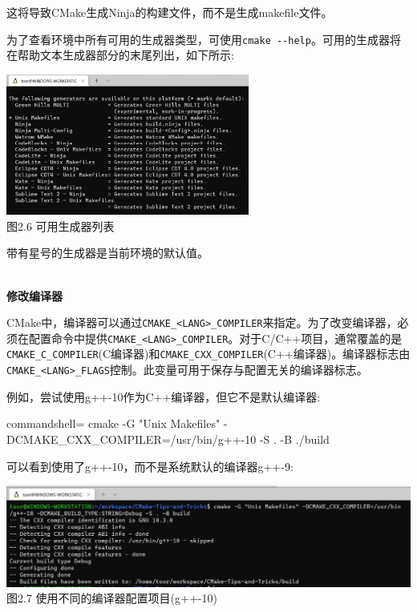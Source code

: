 这将导致CMake生成Ninja的构建文件，而不是生成makefile文件。

为了查看环境中所有可用的生成器类型，可使用\texttt{cmake -{}-help}。可用的生成器将在帮助文本生成器部分的末尾列出，如下所示:

\begin{center}
\includegraphics[width=0.6\textwidth]{content/1/chapter2/images/6.jpg}\\
图2.6 可用生成器列表
\end{center}

带有星号的生成器是当前环境的默认值。

\hspace*{\fill} \\ %
\noindent
\textbf{修改编译器}

CMake中，编译器可以通过\texttt{CMAKE\_<LANG>\_COMPILER}来指定。为了改变编译器，必须在配置命令中提供\texttt{CMAKE\_<LANG>\_COMPILER}。对于C/C++项目，通常覆盖的是\texttt{CMAKE\_C\_COMPILER}(C编译器)和\texttt{CMAKE\_CXX\_COMPILER}(C++编译器)。编译器标志由\texttt{CMAKE\_<LANG>\_FLAGS}控制。此变量可用于保存与配置无关的编译器标志。

例如，尝试使用g++-10作为C++编译器，但它不是默认编译器:

\begin{tcblisting}{commandshell={}}
cmake -G "Unix Makefiles" -DCMAKE_CXX_COMPILER=/usr/bin/g++-10 -S .  
  -B ./build
\end{tcblisting}

可以看到使用了g++-10，而不是系统默认的编译器g++-9:

\begin{center}
\includegraphics[width=1.\textwidth]{content/1/chapter2/images/7.jpg}\\
图2.7 使用不同的编译器配置项目(g++-10)
\end{center}

